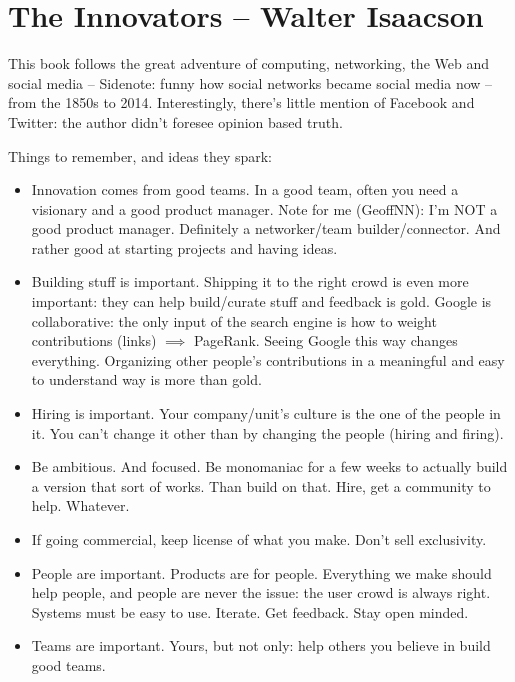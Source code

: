 
\section{The Innovators -- Walter Isaacson}

This book follows the great adventure of computing, networking, the Web and social media
-- Sidenote: funny how social networks became social media now --
from the 1850s to 2014.
Interestingly, there's little mention of Facebook and Twitter: the author didn't foresee opinion based truth.

Things to remember, and ideas they spark:

\begin{itemize}
    \item Innovation comes from good teams. 
    In a good team, often you need a visionary and a good product manager. 
    Note for me (GeoffNN): I'm NOT a good product manager.
    Definitely a networker/team builder/connector.
    And rather good at starting projects and having ideas.
    \item Building stuff is important.
    Shipping it to the right crowd is even more important: they can help build/curate stuff and feedback is gold.
    Google is collaborative: the only input of the search engine is how to weight contributions (links) $\implies$ PageRank.
    Seeing Google this way changes everything.
    Organizing other people's contributions in a meaningful and easy to understand way is more than gold.
    \item Hiring is important.
    Your company/unit's culture is the one of the people in it.
    You can't change it other than by changing the people (hiring and firing).
    \item Be ambitious.
    And focused.
    Be monomaniac for a few weeks to actually build a version that sort of works.
    Than build on that.
    Hire, get a community to help.
    Whatever.
    \item If going commercial, keep license of what you make.
    Don't sell exclusivity.
    \item People are important.
    Products are for people.
    Everything we make should help people, and people are never the issue: the user crowd is always right.
    Systems must be easy to use.
    Iterate.
    Get feedback.
    Stay open minded.
    \item Teams are important.
    Yours, but not only: help others you believe in build good teams.

\end{itemize}
